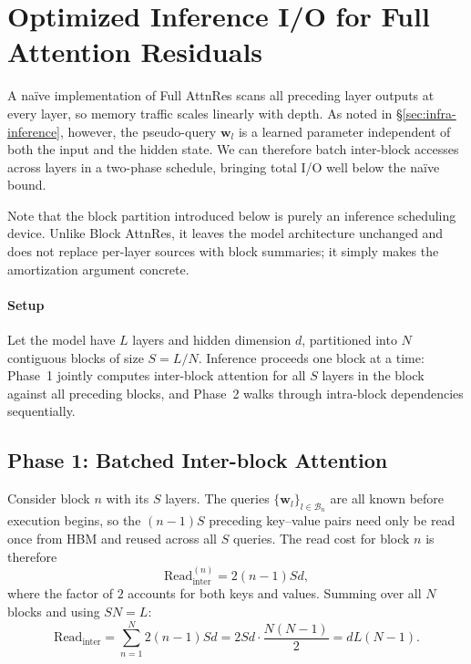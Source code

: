\section{Optimized Inference I/O for Full Attention Residuals}
\label{app:inference}

A na\"ive implementation of Full AttnRes scans all preceding layer outputs at every layer, so memory traffic scales linearly with depth. As noted in \S\ref{sec:infra-inference}, however, the pseudo-query $\bm{w}_l$ is a learned parameter independent of both the input and the hidden state. We can therefore batch inter-block accesses across layers in a two-phase schedule, bringing total I/O well below the na\"ive bound.

Note that the block partition introduced below is purely an inference scheduling device. Unlike Block AttnRes, it leaves the model architecture unchanged and does not replace per-layer sources with block summaries; it simply makes the amortization argument concrete.

\paragraph{Setup}

Let the model have $L$ layers and hidden dimension $d$, partitioned into $N$ contiguous blocks of size $S = L/N$. Inference proceeds one block at a time: Phase~1 jointly computes inter-block attention for all $S$ layers in the block against all preceding blocks, and Phase~2 walks through intra-block dependencies sequentially.

\subsection*{Phase 1: Batched Inter-block Attention}

Consider block $n$ with its $S$ layers. The queries $\{\bm{w}_l\}_{l \in \mathcal{B}_n}$ are all known before execution begins, so the $(n{-}1)S$ preceding key--value pairs need only be read once from HBM and reused across all $S$ queries. The read cost for block $n$ is therefore
\begin{equation}
    \mathrm{Read}_{\text{inter}}^{(n)} = 2(n-1)Sd,
\end{equation}
where the factor of $2$ accounts for both keys and values. Summing over all $N$ blocks and using $SN=L$:
\begin{equation}
    \mathrm{Read}_{\text{inter}} = \sum_{n=1}^{N} 2(n-1)Sd
    = 2Sd \cdot \frac{N(N-1)}{2}
    = dL(N-1).
\end{equation}

